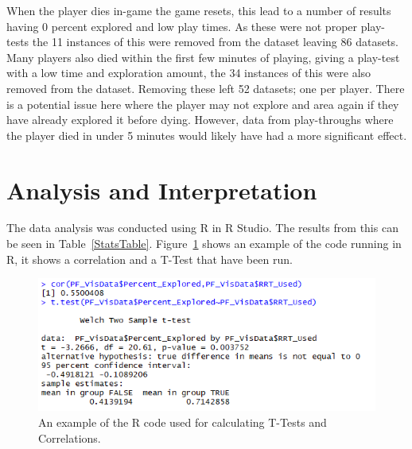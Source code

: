 \documentclass[journal]{IEEEtran}
\begin{document}
	When the player dies in-game the game resets, this lead to a number of results having 0 percent explored and low play times. As these were not proper play-tests the 11 instances of this were removed from the dataset leaving 86 datasets. Many players also died within the first few minutes of playing, giving a play-test with a low time and exploration amount, the 34 instances of this were also removed from the dataset. Removing these left 52 datasets; one per player. There is a potential issue here where the player may not explore and area again if they have already explored it before dying. However, data from play-throughs where the player died in under 5 minutes would likely have had a more significant effect. 
	
	\section{Analysis and Interpretation} \label{Analysis}
	The data analysis was conducted using R in R Studio. The results from this can be seen in Table~\ref{StatsTable}.  Figure~\ref{image:RCor} shows an example of the code running in R, it shows a correlation and a T-Test that have been run. 
	
	\begin{figure}[h]
		\includegraphics[width=1.0\linewidth]{RCor.png}
		\caption{An example of the R code used for calculating T-Tests and Correlations.}
		\label{image:RCor}
	\end{figure}  
	
\end{document}

